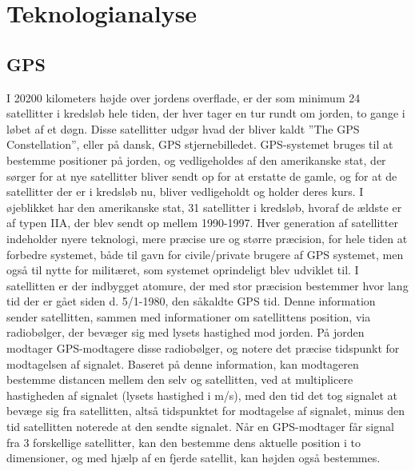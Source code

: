 \section{Teknologianalyse} \label{sec:teknologianalyse}


\subsection{GPS}

I 20200 kilometers højde over jordens overflade, er der som minimum 24 satellitter i kredsløb hele tiden, der hver tager en tur rundt om jorden, to gange i løbet af et døgn. Disse satellitter udgør hvad der bliver kaldt ”The GPS Constellation”, eller på dansk, GPS stjernebilledet.  GPS-systemet bruges til at bestemme positioner på jorden, og vedligeholdes af den amerikanske stat, der sørger for at nye satellitter bliver sendt op for at erstatte de gamle, og for at de satellitter der er i kredsløb nu, bliver vedligeholdt og holder deres kurs. I øjeblikket har den amerikanske stat, 31 satellitter i kredsløb, hvoraf de ældste er af typen IIA, der blev sendt op mellem 1990-1997. Hver generation af satellitter indeholder nyere teknologi, mere præcise ure og større præcision, for hele tiden at forbedre systemet, både til gavn for civile/private brugere af GPS systemet, men også til nytte for militæret, som systemet oprindeligt blev udviklet til. 
I satellitten er der indbygget atomure, der med stor præcision bestemmer hvor lang tid der er gået siden d. 5/1-1980, den såkaldte GPS tid. Denne information sender satellitten, sammen med informationer om satellittens position, via radiobølger, der bevæger sig med lysets hastighed mod jorden. På jorden modtager GPS-modtagere disse radiobølger, og notere det præcise tidspunkt for modtagelsen af signalet. Baseret på denne information, kan modtageren bestemme distancen mellem den selv og satellitten, ved at multiplicere hastigheden af signalet (lysets hastighed i m/s), med den tid det tog signalet at bevæge sig fra satellitten, altså tidspunktet for modtagelse af signalet, minus den tid satellitten noterede at den sendte signalet. Når en GPS-modtager får signal fra 3 forskellige satellitter, kan den bestemme dens aktuelle position i to dimensioner, og med hjælp af en fjerde satellit, kan højden også bestemmes.
